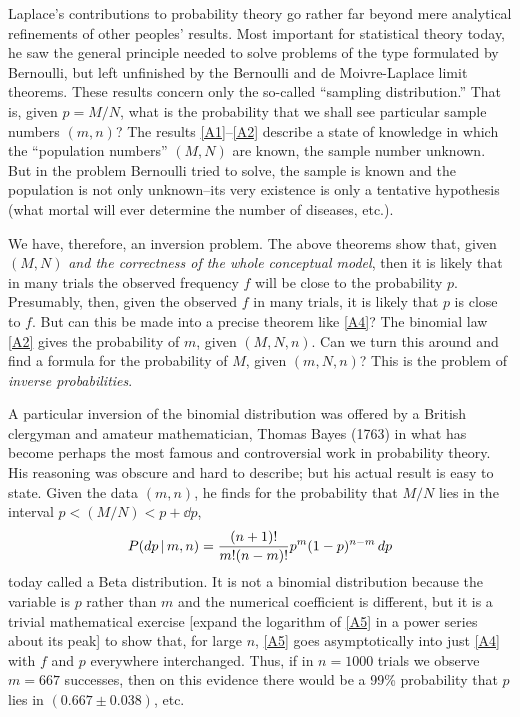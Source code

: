 Laplace's contributions to probability theory go rather far beyond mere analytical refinements of other peoples’ results.
Most important for statistical theory today, he saw the general principle needed to solve problems of the type formulated by Bernoulli, but left unfinished by the Bernoulli and de Moivre-Laplace limit theorems.
These results concern only the so-called ``sampling distribution.'' That is, given $p=M/N$, what is the probability that we shall see particular sample numbers $(m,n)$?
The results \eqref{A1}--\eqref{A2} describe a state of knowledge in which the ``population numbers'' $(M,N)$ are known, the sample number unknown.
But in the problem Bernoulli tried to solve, the sample is known and the population is not only unknown--its very existence is only a tentative hypothesis (what mortal will ever determine the number of diseases, etc.).

We have, therefore, an inversion problem.
The above theorems show that, given $(M, N)$ \emph{and the correctness of the whole conceptual model}, then it is likely that in many trials the observed frequency $f$ will be close to the probability $p$.
Presumably, then, given the observed $f$ in many trials, it is likely that $p$ is close to $f$. But can this be made into a precise theorem like \eqref{A4}?
The binomial law \eqref{A2} gives the probability of $m$, given $(M,N,n)$.
Can we turn this around and find a formula for the probability of $M$, given $(m,N,n)$?
This is the problem of \emph{inverse probabilities}.

A particular inversion of the binomial distribution was offered by a British clergyman and amateur mathematician, Thomas Bayes (\cite{bayes}{1763}) in what has become perhaps the most famous and controversial work in probability theory.
His reasoning was obscure and hard to describe; but his actual result is easy to state.
Given the data $(m,n)$, he finds for the probability that $M/N$ lies in the interval $p < (M/N) < p + \dd p$,
\begin{equation}
	\label{A5}
	P(\mathop{}\!d p\,\vert\, m, n) = \frac{(n+1)!}{m!(n-m)!} p^m (1-p)^{n-m} \mathop{}\!d p
\end{equation}
today called a Beta distribution.
It is not a binomial distribution because the variable is $p$ rather than $m$ and the numerical coefficient is different, but it is a trivial mathematical exercise [expand the logarithm of \eqref{A5} in a power series about its peak] to show that, for large $n$, \eqref{A5} goes asymptotically into just \eqref{A4} with $f$ and $p$ everywhere interchanged.
Thus, if in $n=1000$ trials we observe $m = 667$ successes, then on this evidence there would be a 99\% probability that $p$ lies in $(0.667 \pm 0.038)$, etc.

